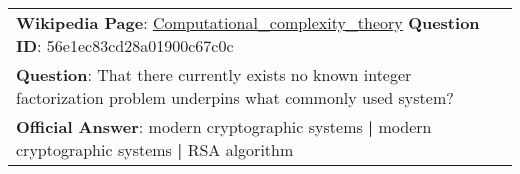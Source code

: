 \begin{figure*}[ht]
{\begin{tabular}{p{}}
            \textbf{Wikipedia Page}: \underline{Computational\_complexity\_theory} \textbf{Question ID}: 56e1ec83cd28a01900c67c0c                                                                                                                                                                                                                                                                                                                                                                                                                                                                                                                                                                                                                                                                                                                                                                                                                                                                                                                         \\
            \textbf{Question}: That there currently exists no known integer factorization problem underpins what commonly used system?                                                                                                                                                                                                                                                                                                                                                                                                                                                                                                                                                                                                                                                                                                                                                                                                                                                                                                                    \\
            \textbf{Official Answer}: modern cryptographic systems \textbf{|} modern cryptographic systems \textbf{|} RSA algorithm                                                                                                                                                                                                                                                                                                                                                                                                                                                                                                                                                                                                                                                                                                                                                                                                                                                                                                                       \\

\end{tabular}}
\end{figure*}
